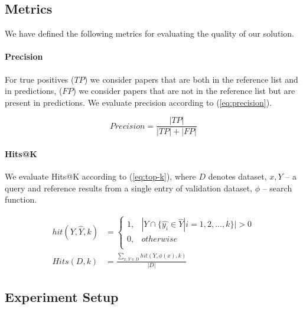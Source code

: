 \documentclass{article}
\begin{document}
    \subsection{Metrics}
    
        We have defined the following metrics for evaluating the quality of our solution.

        \paragraph{Precision}
       
            For true positives (\(TP\)) we consider papers that are both in the reference list and in predictions, (\(FP\)) we consider papers that are not in the reference list but are present in predictions. We evaluate precision according to (\ref{eq:precision}).


            \begin{equation}
                Precision = \frac{|TP|}{|TP| + |FP|}
                \label{eq:precision}
            \end{equation}

        \paragraph{Hits@K}
       
            We evaluate Hits@K according to (\ref{eq:top-k}), where \(D\) denotes dataset, \(x, Y\) -- a query and reference results from a single entry of validation dataset, \(\phi\) -- search function.

            \begin{equation}
                \begin{split}
                    hit(Y, \hat{Y}, k) &= \left\{\begin{matrix}
                        1, & | Y \cap \{\hat{y_{i}} \in \hat{Y} | i=1,2,...,k\} | > 0 \\
                        0, & otherwise \\
                       \end{matrix}\right. \\ 
                    Hits(D, k) &= \frac{\sum_{x, Y \in D} hit(Y, \phi(x), k)}{|D|}
                \end{split}
                \label{eq:top-k}
            \end{equation}

    \subsection{Experiment Setup}
        
\end{document}

